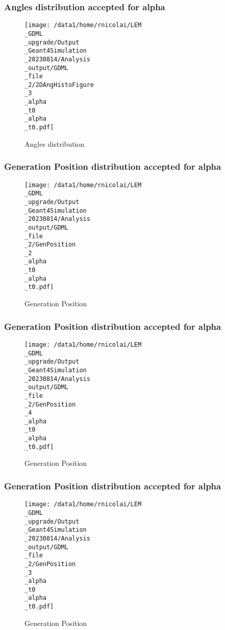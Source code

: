 \documentclass[8pt]{beamer}
\begin{document}
            \begin{frame}
                \frametitle{Angles distribution accepted for alpha}
            
        \begin{figure}[h]
            \centering
            \texttt{[image: /data1/home/rnicolai/LEM\\\_GDML\\\_upgrade/Output\\\_Geant4Simulation\\\_20230814/Analysis\\\_output/GDML\\\_file\\\_2/2DAngHistoFigure\\\_3\\\_alpha\\\_t0\\\_alpha\\\_t0.pdf]}
            \caption{Angles distribution}
        \end{figure}
        
            \end{frame}
            
            \begin{frame}
                \frametitle{Generation Position distribution accepted for alpha}
            
        \begin{figure}[h]
            \centering
            \texttt{[image: /data1/home/rnicolai/LEM\\\_GDML\\\_upgrade/Output\\\_Geant4Simulation\\\_20230814/Analysis\\\_output/GDML\\\_file\\\_2/GenPosition\\\_2\\\_alpha\\\_t0\\\_alpha\\\_t0.pdf]}
            \caption{Generation Position}
        \end{figure}
        
            \end{frame}
            
            \begin{frame}
                \frametitle{Generation Position distribution accepted for alpha}
            
        \begin{figure}[h]
            \centering
            \texttt{[image: /data1/home/rnicolai/LEM\\\_GDML\\\_upgrade/Output\\\_Geant4Simulation\\\_20230814/Analysis\\\_output/GDML\\\_file\\\_2/GenPosition\\\_4\\\_alpha\\\_t0\\\_alpha\\\_t0.pdf]}
            \caption{Generation Position}
        \end{figure}
        
            \end{frame}
            
            \begin{frame}
                \frametitle{Generation Position distribution accepted for alpha}
            
        \begin{figure}[h]
            \centering
            \texttt{[image: /data1/home/rnicolai/LEM\\\_GDML\\\_upgrade/Output\\\_Geant4Simulation\\\_20230814/Analysis\\\_output/GDML\\\_file\\\_2/GenPosition\\\_3\\\_alpha\\\_t0\\\_alpha\\\_t0.pdf]}
            \caption{Generation Position}
        \end{figure}
        
            \end{frame}
            
\end{document}
